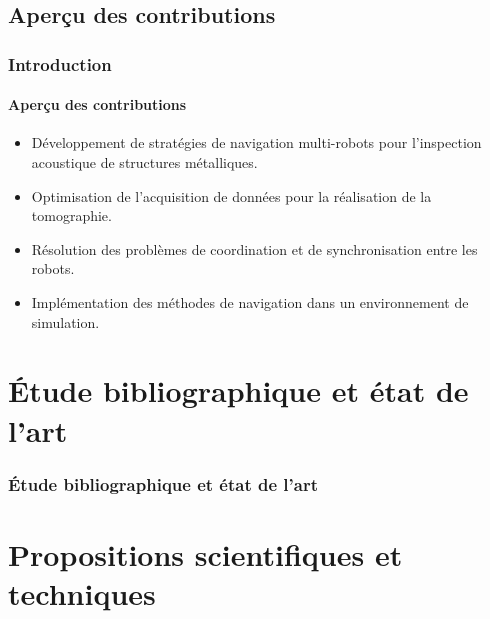 \documentclass{beamer}
\begin{document}
		\subsection*{Aperçu des contributions}
			\begin{frame}
				\frametitle{Introduction}
				\framesubtitle{Aperçu des contributions}
				\begin{itemize}
					\item Développement de stratégies de navigation multi-robots pour l'inspection acoustique de structures métalliques.
					\item Optimisation de l'acquisition de données pour la réalisation de la tomographie.
					\item Résolution des problèmes de coordination et de synchronisation entre les robots.
					\item Implémentation des méthodes de navigation dans un environnement de simulation.
				\end{itemize}
			\end{frame}
	\section{Étude bibliographique et état de l'art}
		\begin{frame}
			\frametitle{Étude bibliographique et état de l'art}
			\tiny
			\nocite{9811581, HUTHWAITE2013979, s22093235, article455556, 9568841, 7487624, 7139673}
			
			
		\end{frame}
	\section{Propositions scientifiques et techniques}
\end{document}
